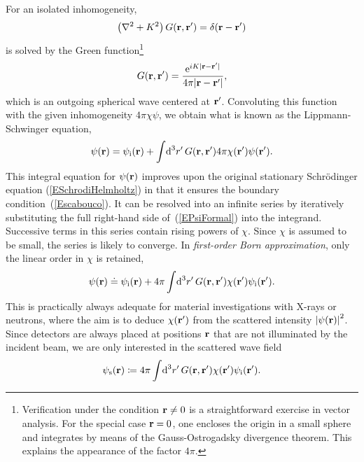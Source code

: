 For an isolated inhomogeneity,
\begin{equation}\label{EHelmholtzForGreen}
  \left(\mathbf{\nabla}^2+K^2\right)G(\mathbf{r},\mathbf{r}') = \delta(\mathbf{r}-\mathbf{r}')
\end{equation}
%
%
is solved by the Green function\footnote
{Verification under the condition $\mathbf{r}\ne0$
is a straightforward exercise in vector analysis.
For the special case $\mathbf{r}=0$,
one encloses the origin in a small sphere
and integrates by means of the Gauss-Ostrogadsky divergence theorem.
This explains the appearance of the factor $4\pi$.}
\begin{equation}\label{EGreens1}
  G(\mathbf{r},\mathbf{r}') = \frac{\text{e}^{iK|\mathbf{r}-\mathbf{r}'|}}{4\pi |\mathbf{r}-\mathbf{r}'|},
\end{equation}
which is an outgoing spherical wave centered at $\mathbf{r}'$.
Convoluting this function with the given inhomogeneity $4\pi\chi\psi$,
we obtain what is known as the Lippmann-Schwinger equation,
\begin{equation}\label{EPsiFormal}
  \psi(\mathbf{r})
  = \psi_{\text{i}}(\mathbf{r})
  + \int\!\text{d}^3r'\, G(\mathbf{r},\mathbf{r}') 4\pi\chi(\mathbf{r}')\psi(\mathbf{r}').
\end{equation}
This integral equation for $\psi(\mathbf{r})$ improves
upon the original stationary Schrödinger equation (\ref{ESchrodiHelmholtz})
in that it ensures the boundary condition~(\ref{Escabouco}).
It can be resolved into an infinite series
by iteratively substituting the full right-hand side of~(\ref{EPsiFormal})
into the integrand.
Successive terms in this series contain rising powers of $\chi$.
Since $\chi$ is assumed to be small, the series is likely to converge.
In \textit{first-order Born approximation},
only the linear order in $\chi$ is retained,
\begin{equation}\label{EBorn}
  \psi(\mathbf{r})
  \doteq \psi_{\text{i}}(\mathbf{r})
  + 4\pi \int\!\text{d}^3r'\, G(\mathbf{r},\mathbf{r}') \chi(\mathbf{r}') \psi_{\text{i}}(\mathbf{r}').
\end{equation}
This is practically always adequate for
material investigations with X-rays or neutrons,
where the aim is to 
deduce $\chi(\mathbf{r}')$ from the scattered intensity ${|\psi(\mathbf{r})|}^2$.
Since detectors are always placed at positions $\mathbf{r}$
that are not illuminated by the incident beam,
we are only interested in the scattered wave field
\begin{equation}\label{EBornS}
  \psi_\text{s}(\mathbf{r})
  \coloneqq 
  4\pi \int\!\text{d}^3r'\, G(\mathbf{r},\mathbf{r}') \chi(\mathbf{r}') \psi_{\text{i}}(\mathbf{r}').
\end{equation}
%
%


